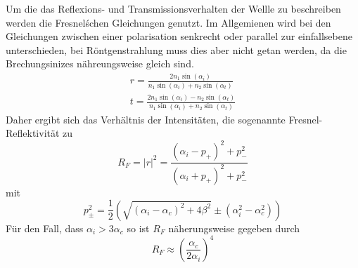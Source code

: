         Um die das Reflexions- und Transmissionsverhalten der Wellle zu beschreiben werden die Fresnel\'schen Gleichungen genutzt.
        Im Allgemienen wird bei den Gleichungen zwischen einer polarisation senkrecht oder parallel zur einfallsebene unterschieden, bei Röntgenstrahlung muss dies aber nicht getan werden, da die Brechungsinizes nähreungsweise gleich sind.
        \begin{align}
            r = \frac{2n_1 \sin\left(\alpha_i\right)}{ n_1 \sin\left(\alpha_i\right) +n_2 \sin\left(\alpha_t\right) } \\
            t = \frac{2n_1 \sin\left(\alpha_i\right) - n_2 \sin\left(\alpha_t\right) }{ n_1 \sin\left(\alpha_i\right) +n_2 \sin\left(\alpha_t\right) }
        \end{align}
        Daher ergibt sich das Verhältnis der Intensitäten, die sogenannte Fresnel-Reflektivität zu 
        \begin{equation}
            R_F = |r|^2 = \frac{\left(\alpha_i - p_+\right)^2 + p_-^2}{\left(\alpha_i + p_+\right)^2 + p_-^2}
        \end{equation}
        mit
        \begin{equation}
            p_\pm^2 = \frac{1}{2} \left(\sqrt{\left( \alpha_i - \alpha_c\right)^2 + 4\beta^2} \pm \left( \alpha_i^2 - \alpha_c^2\right)\right)
        \end{equation}
        Für den Fall, dass $\alpha_i > 3\alpha_c$ so ist $R_F$ näherungsweise gegeben durch
        \begin{equation}
            R_F ≈ \left(\frac{\alpha_c}{2\alpha_i}\right)^4
        \end{equation}
